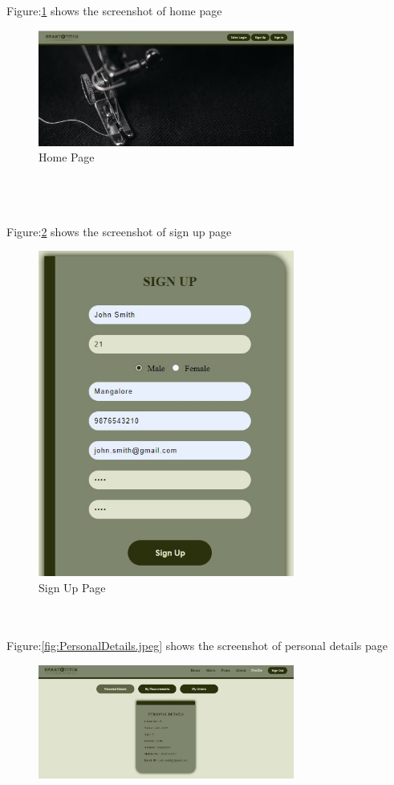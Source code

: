 \documentclass[12pt, letter paper]{report}
\begin{document}
{Figure:\ref{fig:HomePage.jpeg} shows the screenshot of home page 
\begin{figure}[h]
 \centering
 \includegraphics[width=0.75\textwidth]{HomePage.jpeg}
 \caption{Home Page}
 \label{fig:HomePage.jpeg}
\end{figure}
\\
\\
\\
Figure:\ref{fig:signup.jpeg} shows the screenshot of sign up page
\begin{figure}[h]
 \centering
\includegraphics[width=0.75\textwidth,height=0.5\textwidth]{signup.jpeg}
 \caption{Sign Up Page}
 \label{fig:signup.jpeg}
\end{figure}
\\
\\
Figure:\ref{fig:PersonalDetails.jpeg} shows the screenshot of personal details page
\begin{figure}[h]
 \centering
 \includegraphics[width=0.75\textwidth]{PersonalDetails.jpeg}

\end{figure}}
\end{document}
